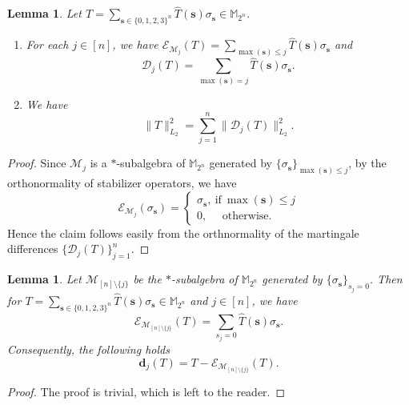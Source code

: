 \documentclass{amsbook}
\newtheorem{lemma}[theorem]{Lemma}
\theoremstyle{definition}
\theoremstyle{remark}
\numberwithin{section}{chapter}
\numberwithin{equation}{chapter}
\newcommand{\M}{\mathbb{M}}
\newcommand{\1}{\mathbf{1}}
\newcommand{\dc}{\mathbf{d}}
\begin{document}
\begin{lemma}\label{BPce} 
	Let $T=\sum_{\mathbf{s}\in\{0,1,2,3\}^{n}}\widehat{T}(\mathbf{s})\sigma_{\mathbf{s}}\in \M_{2^{n}}$. 
	\begin{enumerate}[{\rm (i)}]
		\item For each $j\in[n]$, we have $\mathcal{E}_{\mathcal{M}_{j}}(T)=\sum_{\max(\mathbf{s})\leq j}\widehat{T}(\mathbf{s})\sigma_{\mathbf{s}}$ and
		\begin{equation}\label{martingale decomposition}
			\mathcal{D}_{j}(T)=\sum_{\max(\mathbf{s})=j}\widehat{T}(\mathbf{s})\sigma_{\mathbf{s}}.
		\end{equation}
		\item We have
		\begin{equation}\label{martingale version 2}
			\|T\|^{2}_{L_{2}}=\sum_{j=1}^n\|\mathcal{D}_{j}(T)\|^{2}_{L_{2}}.
		\end{equation}
	\end{enumerate}
\end{lemma}
\begin{proof}
	Since $\mathcal{M}_{j}$ is a $\ast$-subalgebra of $\M_{2^{n}}$ generated by $\{\sigma_{\mathbf{s}}\}_{\max(\mathbf{s})\leq j}$, by the orthonormality of stabilizer operators, we have
	\begin{equation*}
		\mathcal{E}_{\mathcal{M}_{j}}(\sigma_{\mathbf{s}})=
		\begin{cases}
			\sigma_{\mathbf{s}},~\mbox{if}~\max(\mathbf{s})\leq j\\
			0,~~~~~~\mbox{otherwise}.
		\end{cases}
	\end{equation*}
	Hence the claim follows easily from the orthnormality of the martingale differences $\{\mathcal{D}_{j}(T)\}_{j=1}^{n}$.
\end{proof}



\begin{lemma}\label{contraction}
	Let $\mathcal{M}_{[n]\setminus \{j\}}$ be the $\ast$-subalgebra of $\M_{2^{n}}$ generated by $\{\sigma_{\mathbf{s}}\}_{s_{j}=0}$. Then for $T=\sum_{\mathbf{s}\in\{0,1,2,3\}^{n}}\widehat{T}(\mathbf{s})\sigma_{\mathbf{s}}\in \M_{2^{n}}$ and $j\in [n]$, we have
	\[
	\mathcal{E}_{\mathcal{M}_{[n]\setminus \{j\}}}(T)=\sum_{s_{j}=0}\widehat{T}(\mathbf{s})\sigma_{\mathbf{s}}.
	\]
	Consequently, the following holds
	\begin{equation*}
		\dc_{j}(T)=T-\mathcal{E}_{\mathcal{M}_{[n]\setminus \{j\}}}(T).
	\end{equation*}
\end{lemma}
\begin{proof}
	The proof is trivial, which is left to the reader.
\end{proof}
\end{document}
